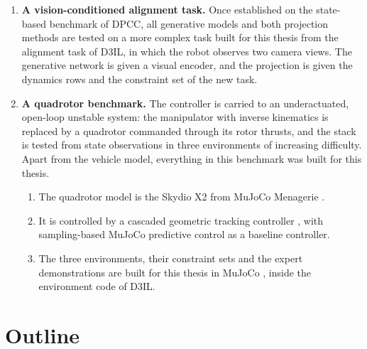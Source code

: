 \begin{enumerate}
    and solver and compared, together with the step budget below which endpoint projection reduces to
    projection after sampling. On obstacle avoidance the guiding step count is zero at one and two
    network evaluations, where endpoint projection reduces to projecting the finished sample; above that
    budget, neither projection method leads consistently (\autoref{sec:res:constraints:degenerate}).
    Where it has guiding steps, endpoint projection takes less time per control step than per-step
    projection in every environment; on UAV-corridor it is also less often collision-free
    (\autoref{sec:res:constraints}).
  \item \textbf{A vision-conditioned alignment task.} Once established on the state-based benchmark
    of \ac{DPCC}, all generative models and both projection methods are tested on a more complex
    task built for this thesis from the alignment task of D3IL, in which the robot observes two camera
    views. The generative network is given a visual encoder, and the projection is given the dynamics
    rows and the constraint set of the new task.
  \item \textbf{A quadrotor benchmark.} The controller is carried to an underactuated, open-loop
    unstable system: the manipulator with inverse kinematics is replaced by a quadrotor commanded
    through its rotor thrusts, and the stack is tested from state observations in three environments
    of increasing difficulty. Apart from the vehicle model, everything in this benchmark was built for
    this thesis.
    \begin{enumerate}
      \item The quadrotor model is the Skydio X2 from MuJoCo Menagerie
        \parencite{todorov2012mujoco,zakka2022menagerie}.
      \item It is controlled by a cascaded geometric tracking controller \parencite{lee2010geometric},
        with sampling-based MuJoCo predictive control \parencite{howell2022predictive} as a baseline
        controller.
      \item The three environments, their constraint sets and the expert demonstrations are built
        for this thesis in MuJoCo \parencite{todorov2012mujoco}, inside the environment code of
        D3IL.
    \end{enumerate}
\end{enumerate}

\section{Outline}\label{sec:intro:outline}


